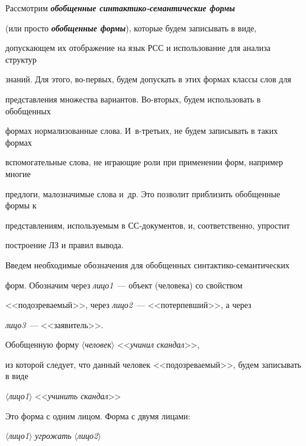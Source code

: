    Рассмотрим {\bfseries\textit{обобщенные синтактико-семантические формы}} 


(или просто {\bfseries\textit{обобщенные формы}}), которые будем записывать в виде, 


допускающем их отображение на язык РСС и использование для анализа структур 


знаний. Для этого, во-первых, будем допускать в этих формах классы слов для 


представления множества вариантов. Во-вторых, будем использовать в обобщенных 


формах нормализованные слова. И~в-третьих, не будем записывать в таких формах 


вспомогательные слова, не играющие роли при применении форм, например многие 


предлоги, малозначимые слова и~др. Это позволит приблизить обобщенные формы к 


представлениям, используемым в СС-документов, и, соответственно, упростит 


построение ЛЗ и правил вывода.


   


   Введем необходимые обозначения для обобщенных синтактико-се\-ман\-ти\-че\-ских 


форм. Обозначим через \textit{лицо1}~--- объект (человека) со свойством 


<<{подозреваемый}>>,  через \textit{лицо2}~--- <<{потерпевший}>>, а через 


\textit{лицо3}~--- <<заявитель>>.  


   


   Обобщенную форму $\langle$\textit{человек}$\rangle$ <<\textit{учинил скандал}>>, 


из которой следует, что данный человек <<подозреваемый>>, будем записывать в виде 


   


$\langle$\textit{лицо1}$\rangle$ <<\textit{учинить скандал}>>





Это форма с одним лицом. Форма с двумя лицами:





$\langle$\textit{лицо1}$\rangle$ \textit{угрожать} $\langle$\textit{лицо2}$\rangle$





